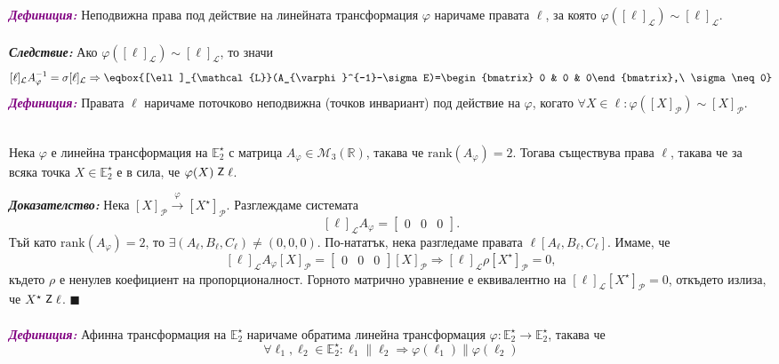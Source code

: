 \documentclass[12pt]{article}
\newcommand{\inc}{\mathrel{\raisebox{0.18ex}{\small$\mathsf{Z}$}}}
\begin{document}
\textbf{\textit{\textcolor{purple}{Дефиниция:}}} Неподвижна права под действие на линейната трансформация $\varphi$ наричаме правата $\ell$, за която $\varphi([\ell]_\mathcal{L})\sim[\ell]_{\mathcal L}$.
\\
\\
\textbf{\textit{Следствие:}} Ако $\varphi([\ell]_{\mathcal L})\sim[\ell]_{\mathcal L}$, то значи $$ [\ell]_{\mathcal L} A_{\varphi}^{-1}=\sigma [\ell]_{\mathcal L}\Rightarrow\eqbox{[\ell]_{\mathcal{L}}(A_{\varphi}^{-1}-\sigma E)=\begin{bmatrix} 0 & 0 & 0\end{bmatrix},\ \sigma\neq 0}$$
\textbf{\textit{\textcolor{purple}{Дефиниция:}}} Правата $\ell$ наричаме поточково неподвижна (точков инвариант) под действие на $\varphi$, когато $\forall X\in \ell:\varphi([X]_{\mathcal P})\sim [X]_{\mathcal P}$.
\\
\\
\begin{tcolorbox}[
    colback=blue!5,    %
    colframe=blue!75!black, %
    title={\textbf{Твърдение 9:}}, %
    fonttitle=\bfseries,
    boxrule=0.8pt,
    arc=1mm,           %
    top=2mm, bottom=2mm, left=3mm, right=3mm
]   Нека $\varphi$ е линейна трансформация на $\mathbb{E}_2^\star$ с матрица $A_{\varphi}\in\mathcal{M}_3(\mathbb{R})$, такава че $\mathrm{rank}(A_\varphi)=2$. Тогава съществува права $\ell$, такава че за всяка точка $X\in\mathbb{E}_2^\star$ е в сила, че $\varphi(X)\inc \ell$.
\end{tcolorbox}
\textbf{\textit{Доказателство:}} Нека $[X]_{\mathcal P}\xrightarrow{\varphi} [X^\star]_{\mathcal P}$. Разглеждаме системата $$[\ell]_{\mathcal L} A_\varphi = \begin{bmatrix}0 & 0 & 0\end{bmatrix}.$$ Тъй като $\mathrm{rank}(A_\varphi)=2$, то $\exists(A_\ell,B_\ell,C_\ell)\neq(0,0,0)$. По-нататък, нека разгледаме правата $\ell[A_\ell, B_\ell,C_\ell].$ Имаме, че $$[\ell]_{\mathcal L} A_{\varphi}[X]_{\mathcal P}= \begin{bmatrix}0 & 0 & 0\end{bmatrix}[X]_{\mathcal P}\Rightarrow [\ell]_{\mathcal L}\rho [X^\star]_{\mathcal P}=0,$$ където $\rho$ е ненулев коефициент на пропорционалност. Горното матрично уравнение е еквивалентно на $[\ell]_{\mathcal L} [X^\star]_{\mathcal P}=0$, откъдето излиза, че $X^\star\inc\ell$. $\blacksquare$
\\
\\
\textbf{\textit{\textcolor{purple}{Дефиниция:}}} Афинна трансформация на $\mathbb{E}_2^\star$ наричаме обратима линейна трансформация $\varphi:\mathbb{E}_2^\star\to\mathbb{E}_2^\star$, такава че $$\forall \ell_1,\ell_2\in\mathbb{E}_2^\star:\ell_1\parallel \ell_2\Rightarrow \varphi(\ell_1)\parallel \varphi(\ell_2)$$
\end{document}
